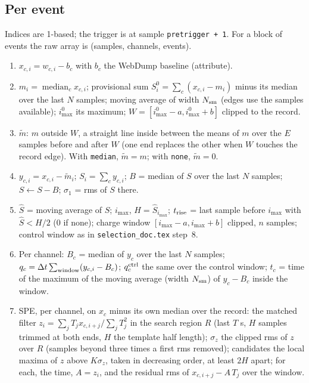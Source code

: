 \documentclass[11pt]{article}
\newcommand{\code}[1]{\texttt{#1}}
\newcommand{\us}{\textmu s}
\begin{document}
\subsection{Per event}

Indices are 1-based; the trigger is at sample \code{pretrigger + 1}. For a
block of events the raw array is (samples, channels, events).

\begin{enumerate}
\item $x_{c,i} = w_{c,i} - b_c$ with $b_c$ the WebDump baseline (attribute).
\item $m_i = \operatorname{median}_c x_{c,i}$; provisional sum $S^0_i =
  \sum_c (x_{c,i} - m_i)$ minus its median over the last $N$ samples;
  moving average of width $N_{\rm sm}$ (edges use the samples available);
  $i^0_{\max}$ its maximum; $W = [i^0_{\max} - a, i^0_{\max} + b]$ clipped
  to the record.
\item $\tilde m$: $m$ outside $W$, a straight line inside between the means
  of $m$ over the $E$ samples before and after $W$ (one end replaces the
  other when $W$ touches the record edge). With \code{median}, $\tilde m =
  m$; with \code{none}, $\tilde m = 0$.
\item $y_{c,i} = x_{c,i} - \tilde m_i$; $S_i = \sum_c y_{c,i}$; $B$ =
  median of $S$ over the last $N$ samples; $S \leftarrow S - B$; $\sigma_1$
  = rms of $S$ there.
\item $\hat S$ = moving average of $S$; $i_{\max}$, $H = \hat S_{i_{\max}}$;
  $t_{\rm rise}$ = last sample before $i_{\max}$ with $\hat S < H/2$ (0 if
  none); charge window $[i_{\max} - a, i_{\max} + b]$ clipped, $n$ samples;
  control window as in \code{selection\_doc.tex} step~8.
\item Per channel: $B_c$ = median of $y_c$ over the last $N$ samples; $q_c
  = \Delta t \sum_{\rm window} (y_{c,i} - B_c)$; $q_c^{\rm ctrl}$ the same
  over the control window; $t_c$ = time of the maximum of the moving
  average (width $N_{\rm sm}$) of $y_c - B_c$ inside the window.
\item SPE, per channel, on $x_c$ minus its own median over the record: the
  matched filter $z_i = \sum_j T_j x_{c,i+j} / \sum_j T_j^2$ in the search
  region $R$ (last $T$ \us{}, $H$ samples trimmed at both ends, $H$ the
  template half length); $\sigma_z$ the clipped rms of $z$ over $R$
  (samples beyond three times a first rms removed); candidates the local
  maxima of $z$ above $K\sigma_z$, taken in decreasing order, at least
  $2H$ apart; for each, the time, $A = z_i$, and the residual rms of
  $x_{c,i+j} - A\,T_j$ over the window.
\end{enumerate}
\end{document}
